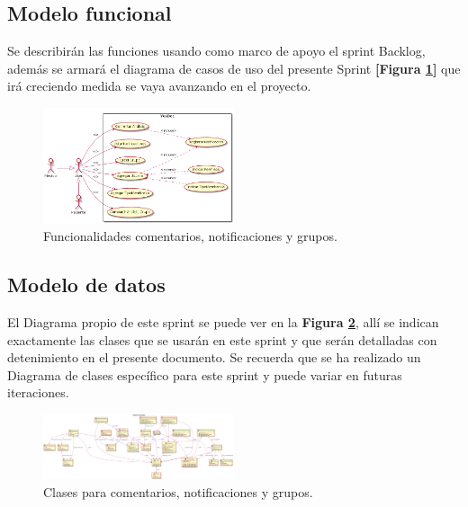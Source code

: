 \subsection{Modelo funcional} 
Se describirán las funciones usando como marco de apoyo el sprint Backlog, además se armará el diagrama de casos de uso del presente Sprint \textbf{[Figura \ref{dcu-sprint-9}]} que irá creciendo  medida se vaya avanzando en el proyecto.

\newpage

    \begin{figure}[h]
        \centering
        \includegraphics[width=0.5\textwidth]{img/dcu_sprint9}
        \caption{Funcionalidades comentarios, notificaciones y grupos.}
		\label{dcu-sprint-9}
    \end{figure}
    
\subsection{Modelo de datos}
El Diagrama propio de este sprint se puede ver en la \textbf{Figura \ref{9-clases_comentario_grupos}}, allí se indican exactamente las clases que se usarán en este sprint y que serán detalladas con detenimiento en el presente documento. Se recuerda que se ha realizado un Diagrama de clases específico para este sprint y puede variar en futuras iteraciones.

    \begin{figure}[h]
        \centering
        \includegraphics[width=0.5\textwidth]{img/dc_sprint9}
        \caption{Clases para comentarios, notificaciones y grupos.}
		\label{9-clases_comentario_grupos}
    \end{figure}

